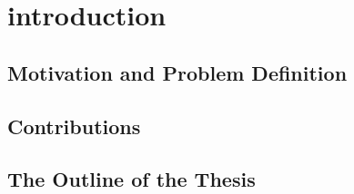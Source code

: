 \chapter{introduction}
\label{chp:intro}


\section{Motivation and Problem Definition}  %
\label{sec:intro_motivation}



\section{Contributions} %

\section{The Outline of the Thesis} %

